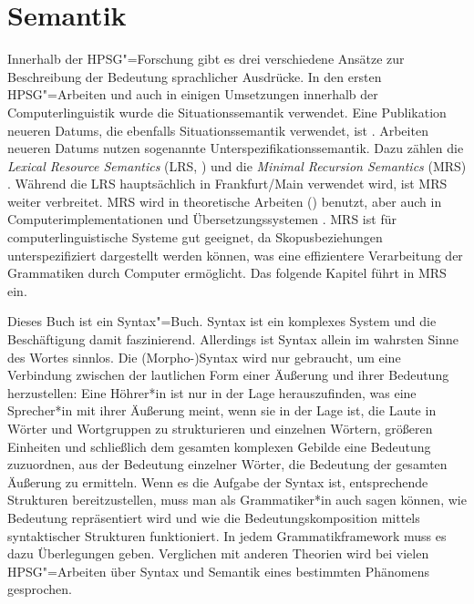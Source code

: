 
\chapter{Semantik}
\label{Kapitel-sem}\label{Kapitel-Semantik}


Innerhalb der HPSG"=Forschung gibt es drei verschiedene Ansätze
zur Beschreibung der Bedeutung sprachlicher Ausdrücke. In den ersten
HPSG"=Arbeiten \citep{ps,ps2,Mueller99a} und auch in einigen Umsetzungen 
innerhalb der Computerlinguistik wurde die Situationssemantik
\citep*{BP83a,CMP90,Devlin92}\nocite{BP87a} verwendet.
Eine Publikation neueren Datums, die ebenfalls Situationssemantik verwendet,
ist . Arbeiten neueren Datums nutzen sogenannte
Unterspezifikationssemantik. Dazu zählen die \emph{Lexical Resource Semantics} (LRS,
\citealt{RS2004a-u}) und die \emph{Minimal Recursion Semantics}
(MRS) \citep*{CFPS2005a}. Während die LRS hauptsächlich in Frankfurt/Main verwendet wird, ist MRS
weiter verbreitet. MRS wird in theoretische Arbeiten (\zb {}) benutzt, aber auch in
Computerimplementationen und Übersetzungssystemen \parencites{BFO2002a-u}{MuellerCoreGram}. MRS ist für computerlinguistische Systeme gut geeignet, da
Skopusbeziehungen unterspezifiziert dargestellt werden können, was eine effizientere
Verarbeitung der Grammatiken durch Computer ermöglicht.
Das folgende Kapitel führt in MRS ein.

Dieses Buch ist ein Syntax"=Buch. Syntax ist ein komplexes System und die Beschäftigung damit
faszinierend. Allerdings ist Syntax allein im wahrsten Sinne des Wortes sinnlos. Die (Morpho-)Syntax wird nur gebraucht, um eine
Verbindung zwischen der lautlichen Form einer Äußerung und ihrer Bedeutung herzustellen: Eine
Höhrer*in ist nur in der Lage herauszufinden, was eine Sprecher*in mit ihrer Äußerung meint, wenn
sie in der Lage ist, die Laute in Wörter und Wortgruppen zu strukturieren und einzelnen Wörtern,
größeren Einheiten und schließlich dem gesamten komplexen Gebilde
eine Bedeutung zuzuordnen, \dash aus der Bedeutung einzelner Wörter, die Bedeutung der gesamten
Äußerung zu ermitteln. Wenn es die Aufgabe der Syntax ist, entsprechende Strukturen bereitzustellen,
muss man als Grammatiker*in auch sagen können, wie Bedeutung repräsentiert wird und wie die
Bedeutungskomposition mittels syntaktischer Strukturen funktioniert. In jedem Grammatikframework
muss es dazu Überlegungen geben. Verglichen mit anderen Theorien wird bei vielen HPSG"=Arbeiten über Syntax und Semantik eines
bestimmten Phänomens gesprochen.

